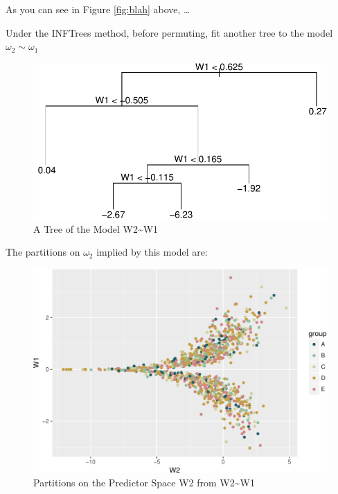 \documentclass[12pt,twoside]{reedthesis}
\begin{document}
  As you can see in Figure \ref{fig:blah} above, \ldots{}
  
  Under the INFTrees method, before permuting, fit another tree to the
  model \(\omega_2 \sim \omega_1\)
  
  \begin{figure}[htbp]
  \centering
  \includegraphics{Thesis_files/figure-latex/t2ch4-1.pdf}
  \caption{\label{fig:t2ch4}A Tree of the Model W2\textasciitilde{}W1}
  \end{figure}
  
  The partitions on \(\omega_2\) implied by this model are:
  
  \begin{figure}[htbp]
  \centering
  \includegraphics{Thesis_files/figure-latex/p4ch4-1.pdf}
  \caption{\label{fig:p4ch4}Partitions on the Predictor Space W2 from
  W2\textasciitilde{}W1}
  \end{figure}
  
\end{document}
